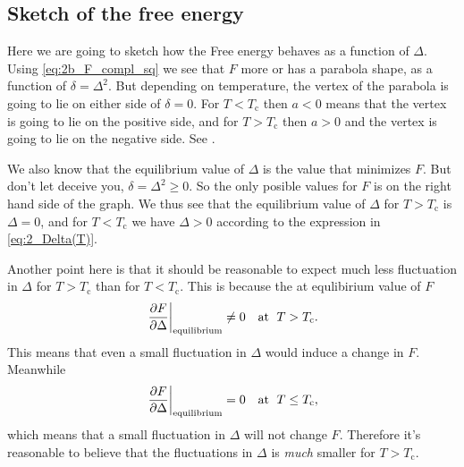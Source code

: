 \documentclass[11pt,letter, swedish, english
]{article}
\newcommand{\Tc}{\ensuremath{T_{\text{c}}}}
\begin{document}
\subsection{Sketch of the free energy}
Here we are going to sketch how the Free energy behaves as a function
of $\Delta$.
Using \eqref{eq:2b_F_compl_sq} we see that $F$ more or has a
parabola shape, as a function of $\delta=\Delta^2$. But depending on
temperature, the vertex of the parabola is going to lie on either side
of $\delta=0$. For $T<\Tc$ then $a<0$ means that the vertex is going
to lie on the positive side, and for $T>\Tc$ then $a>0$ and the vertex
is going to lie on the negative side. See .


We also know that the equilibrium value of $\Delta$ is the value that
minimizes $F$. But don't let  deceive you,
$\delta=\Delta^2\ge0$. So the only posible values for $F$ is on the
right hand side of the graph. 
We thus see that the equilibrium value of $\Delta$ for $T>\Tc$ is
$\Delta=0$, and for $T<\Tc$ we have $\Delta>0$ according to the
expression in \eqref{eq:2_Delta(T)}.

Another point here is that it should be reasonable to expect much less
fluctuation in $\Delta$ for $T>\Tc$ than for $T<\Tc$. This is because
the at equlibirium value of $F$ 
\begin{equation}
\eval{\pdv{F}{\Delta}}_{\text{equilibrium}}\neq0\quad\text{at }\;T>\Tc.
\end{equation}
This means that even a small fluctuation in $\Delta$ would induce a
change in $F$. Meanwhile
\begin{equation}
\eval{\pdv{F}{\Delta}}_{\text{equilibrium}}=0\quad\text{at }\;T\le\Tc,
\end{equation}
which means that a small fluctuation in $\Delta$ will not change
$F$. Therefore it's reasonable to believe that the fluctuations in
$\Delta$ is \emph{much} smaller for $T>\Tc$.



\begin{figure}
\centering
\resizebox{.8\textwidth}{!}{}
\caption{}
\label{fig:2_F}
\end{figure}
\end{document}
